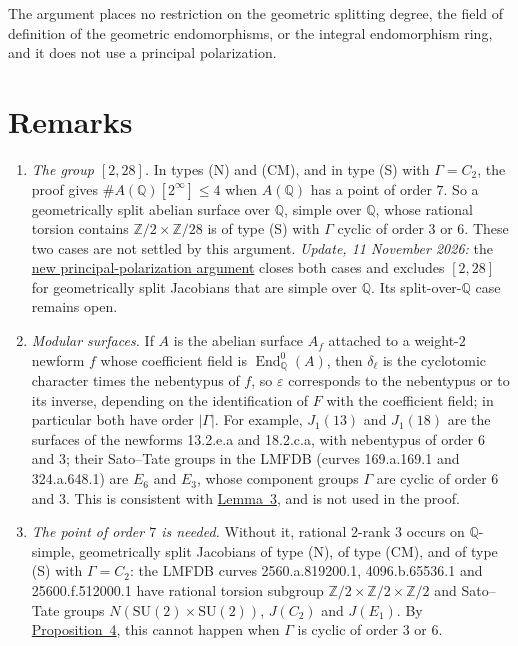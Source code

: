 \documentclass[11pt]{article}
\newcommand{\Q}{\mathbb Q}
\newcommand{\Z}{\mathbb Z}
\DeclareMathOperator{\End}{End}
\begin{document}
The argument places no restriction on the geometric splitting degree, the field of definition of
the geometric endomorphisms, or the integral endomorphism ring, and it does not use a principal
polarization.

\section{Remarks}\label{remarks}

\begin{enumerate}
\item \emph{The group \([2,28]\).} In types (N) and (CM), and in type (S) with \(\Gamma=C_2\), the
proof gives \(\#A(\Q)[2^\infty]\le4\) when \(A(\Q)\) has a point of order \(7\). So a
geometrically split abelian surface over \(\Q\), simple over \(\Q\), whose rational torsion
contains \(\Z/2\times\Z/28\) is of type (S) with \(\Gamma\) cyclic of order \(3\) or \(6\). These
two cases are not settled by this argument. \emph{Update, 11 November 2026:}
the \href{https://genus-2-torsion.github.io/proofs/qsimple-228-obstruction.html}{new
principal-polarization argument} closes both cases and excludes
\href{https://genus-2-torsion.github.io/group.html?g=2.28}{\([2,28]\)} for geometrically split
Jacobians that are simple over \(\Q\). Its split-over-\(\Q\) case remains open.

\item \emph{Modular surfaces.} If \(A\) is the abelian surface \(A_f\) attached to a weight-\(2\)
newform \(f\) whose coefficient field is \(\End^0_{\Q}(A)\), then \(\delta_\ell\) is the
cyclotomic character times the nebentypus of \(f\), so \(\varepsilon\) corresponds to the
nebentypus or to its inverse, depending on the identification of \(F\) with the coefficient field;
in particular both have order \(|\Gamma|\). For
example, \(J_1(13)\) and \(J_1(18)\) are the surfaces of the newforms 13.2.e.a and 18.2.c.a, with
nebentypus of order \(6\) and \(3\); their Sato--Tate groups in the LMFDB (curves 169.a.169.1 and
324.a.648.1) are \(E_6\) and \(E_3\), whose component groups \(\Gamma\) are cyclic of order \(6\)
and \(3\). This is consistent with \hyperref[lemma-det]{Lemma~3}, and is not used in the proof.

\item \emph{The point of order \(7\) is needed.} Without it, rational \(2\)-rank \(3\) occurs on
\(\Q\)-simple, geometrically split Jacobians of type (N), of type (CM), and of type (S) with
\(\Gamma=C_2\): the LMFDB curves 2560.a.819200.1, 4096.b.65536.1 and 25600.f.512000.1 have rational
torsion subgroup \(\Z/2\times\Z/2\times\Z/2\) and Sato--Tate groups \(N(\mathrm{SU}(2)\times
\mathrm{SU}(2))\), \(J(C_2)\) and \(J(E_1)\). By \hyperref[prop-cyclic]{Proposition~4}, this cannot
happen when \(\Gamma\) is cyclic of order \(3\) or \(6\).
\end{enumerate}
\end{document}
